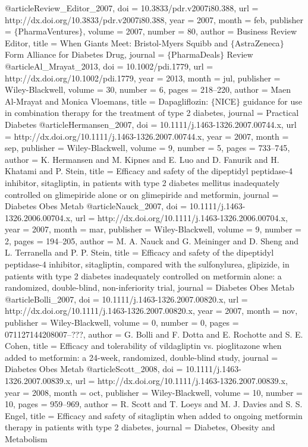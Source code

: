 @article{Review_Editor_2007,
	doi = {10.3833/pdr.v2007i80.388},
	url = {http://dx.doi.org/10.3833/pdr.v2007i80.388},
	year = 2007,
	month = {feb},
	publisher = {$\lbrace$PharmaVentures$\rbrace$},
	volume = {2007},
	number = {80},
	author = {Business Review Editor},
	title = {When Giants Meet: Bristol-Myers Squibb and $\lbrace$AstraZeneca$\rbrace$ Form Alliance for Diabetes Drug},
	journal = {$\lbrace$PharmaDeals$\rbrace$ Review}
}
@article{Al_Mrayat_2013,
	doi = {10.1002/pdi.1779},
	url = {http://dx.doi.org/10.1002/pdi.1779},
	year = 2013,
	month = {jul},
	publisher = {Wiley-Blackwell},
	volume = {30},
	number = {6},
	pages = {218--220},
	author = {Ma{\textquotesingle}en Al-Mrayat and Monica Vloemans},
	title = {Dapagliflozin: $\lbrace$NICE$\rbrace$ guidance for use in combination therapy for the treatment of type 2 diabetes},
	journal = {Practical Diabetes}
}
@article{Hermansen_2007,
	doi = {10.1111/j.1463-1326.2007.00744.x},
	url = {http://dx.doi.org/10.1111/j.1463-1326.2007.00744.x},
	year = 2007,
	month = {sep},
	publisher = {Wiley-Blackwell},
	volume = {9},
	number = {5},
	pages = {733--745},
	author = {K. Hermansen and M. Kipnes and E. Luo and D. Fanurik and H. Khatami and P. Stein},
	title = {Efficacy and safety of the dipeptidyl peptidase-4 inhibitor, sitagliptin, in patients with type 2 diabetes mellitus inadequately controlled on glimepiride alone or on glimepiride and metformin},
	journal = {Diabetes Obes Metab}
}
@article{Nauck_2007,
	doi = {10.1111/j.1463-1326.2006.00704.x},
	url = {http://dx.doi.org/10.1111/j.1463-1326.2006.00704.x},
	year = 2007,
	month = {mar},
	publisher = {Wiley-Blackwell},
	volume = {9},
	number = {2},
	pages = {194--205},
	author = {M. A. Nauck and G. Meininger and D. Sheng and L. Terranella and P. P. Stein},
	title = {Efficacy and safety of the dipeptidyl peptidase-4 inhibitor, sitagliptin, compared with the sulfonylurea, glipizide, in patients with type 2 diabetes inadequately controlled on metformin alone: a randomized, double-blind, non-inferiority trial},
	journal = {Diabetes Obes Metab}
}
@article{Bolli_2007,
	doi = {10.1111/j.1463-1326.2007.00820.x},
	url = {http://dx.doi.org/10.1111/j.1463-1326.2007.00820.x},
	year = 2007,
	month = {nov},
	publisher = {Wiley-Blackwell},
	volume = {0},
	number = {0},
	pages = {071127144208007--???},
	author = {G. Bolli and F. Dotta and E. Rochotte and S. E. Cohen},
	title = {Efficacy and tolerability of vildagliptin vs. pioglitazone when added to metformin: a 24-week, randomized, double-blind study},
	journal = {Diabetes Obes Metab}
}
@article{Scott_2008,
	doi = {10.1111/j.1463-1326.2007.00839.x},
	url = {http://dx.doi.org/10.1111/j.1463-1326.2007.00839.x},
	year = 2008,
	month = {oct},
	publisher = {Wiley-Blackwell},
	volume = {10},
	number = {10},
	pages = {959--969},
	author = {R. Scott and T. Loeys and M. J. Davies and S. S. Engel},
	title = {Efficacy and safety of sitagliptin when added to ongoing metformin therapy in patients with type 2 diabetes{\ast}},
	journal = {Diabetes, Obesity and Metabolism}
}
